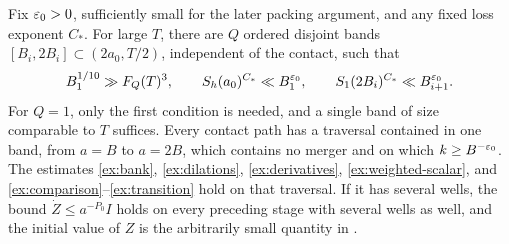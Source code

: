 \begin{lemma}
\label{ex:bands}
Fix \(\varepsilon_0>0\), sufficiently small for the later packing
argument, and any fixed loss exponent \(C_*\). For large \(T\),
there are \(Q\) ordered disjoint bands
\([B_i,2B_i]\subset(2a_0,T/2)\), independent of the contact,
such that
\begin{equation}
 B_1^{1/10}\gg F_Q(T)^3,\qquad
 S_h(a_0)^{C_*}\ll B_1^{\varepsilon_0},\qquad
 S_1(2B_i)^{C_*}\ll B_{i+1}^{\varepsilon_0}.
 \label{ex:band-spacing}
\end{equation}
For \(Q=1\), only the first condition is needed, and a single
band of size comparable to \(T\) suffices. Every contact path has
a traversal contained in one band, from \(a=B\) to \(a=2B\),
which contains no merger and on which \(k\ge B^{-\varepsilon_0}\).
The estimates \eqref{ex:bank}, \eqref{ex:dilations},
\eqref{ex:derivatives}, \eqref{ex:weighted-scalar}, and
\eqref{ex:comparison}--\eqref{ex:transition} hold on that traversal.
If it has several wells, the bound
\(\dot Z\le a^{-P_0}I\) holds on every preceding stage with
several wells as well, and the initial value of \(Z\) is the
arbitrarily small quantity in .
\end{lemma}

